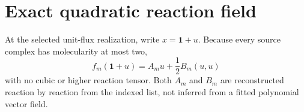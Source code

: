 \section*{Exact quadratic reaction field}
At the selected unit-flux realization, write $x=\mathbf1+u$.  Because every
source complex has molecularity at most two,
\[
f_m(\mathbf1+u)=A_mu+\frac12B_m(u,u)
\]
with no cubic or higher reaction tensor.  Both $A_m$ and $B_m$ are reconstructed
reaction by reaction from the indexed list, not inferred from a fitted
polynomial vector field.
